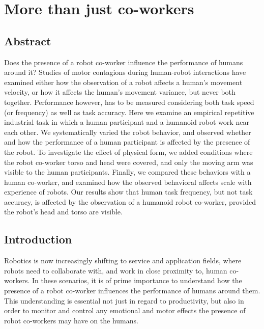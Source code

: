 \documentclass[a4paper, 12pt, oneside]{Thesis}  %
\begin{document}
\clearpage

{\color{blue}\chapter{More than just co-workers}\label{more than just co-workers}}

\section*{Abstract}
Does the presence of a robot co-worker influence the performance of humans around it? Studies of motor contagions during human-robot interactions have examined either how the observation of a robot affects a human's movement velocity, or how it affects the human's movement variance, but never both together. Performance however, has to be measured considering both task speed (or frequency) as well as task accuracy. Here we examine an empirical repetitive industrial task in which a human participant and a humanoid robot work near each other. We systematically varied the robot behavior, and observed whether and how the performance of a human participant is affected by the presence of the robot. To investigate the effect of physical form, we added conditions where the robot co-worker torso and head were covered, and only the moving arm was visible to the human participants. Finally, we compared these behaviors with a human co-worker, and examined how the observed behavioral affects scale with experience of robots. Our results show that human task frequency, but not task accuracy, is affected by the observation of a humanoid robot co-worker, provided the robot's head and torso are visible.

\clearpage
\section{Introduction}
Robotics is now increasingly shifting to service and application fields, where robots need to collaborate with, and work in close proximity to, human co-workers. In these scenarios, it is of prime importance to understand how the presence of a robot co-worker influences the performance of humans around them. This understanding is essential not just in regard to productivity, but also in order to monitor and control any emotional and motor effects the presence of robot co-workers may have on the humans.
\end{document}
